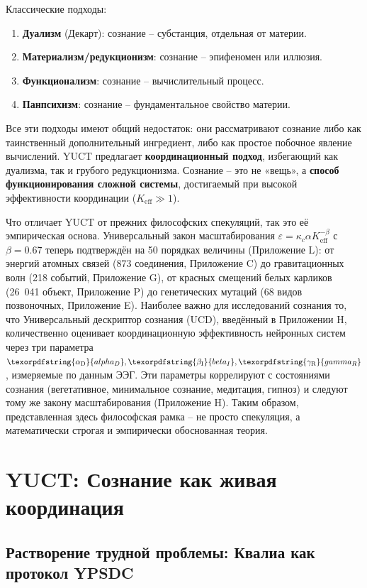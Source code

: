 \documentclass[12pt,a4paper]{article}
\DeclareRobustCommand{\alD}{\texorpdfstring{\ensuremath{\alpha_{\mathrm{D}}}}{alpha_D}}
\DeclareRobustCommand{\beI}{\texorpdfstring{\ensuremath{\beta_{\mathrm{I}}}}{beta_I}}
\DeclareRobustCommand{\gaR}{\texorpdfstring{\ensuremath{\gamma_{\mathrm{R}}}}{gamma_R}}
\newcommand{\eff}{\mathrm{eff}}
\newcommand{\Ke}{K_{\eff}}
\begin{document}
	Классические подходы:
	\begin{enumerate}
		\item \textbf{Дуализм} (Декарт): сознание – субстанция, отдельная от материи.
		\item \textbf{Материализм/редукционизм}: сознание – эпифеномен или иллюзия.
		\item \textbf{Функционализм}: сознание – вычислительный процесс.
		\item \textbf{Панпсихизм}: сознание – фундаментальное свойство материи.
	\end{enumerate}
	
	Все эти подходы имеют общий недостаток: они рассматривают сознание либо как таинственный дополнительный ингредиент, либо как простое побочное явление вычислений. YUCT предлагает \textbf{координационный подход}, избегающий как дуализма, так и грубого редукционизма. Сознание – это не «вещь», а \textbf{способ функционирования сложной системы}, достигаемый при высокой эффективности координации ($\Ke \gg 1$).
	
	Что отличает YUCT от прежних философских спекуляций, так это её эмпирическая основа. Универсальный закон масштабирования \(\varepsilon = \kappa_c \alpha \Ke^{-\beta}\) с \(\beta = 0.67\) теперь подтверждён на 50 порядках величины (Приложение L): от энергий атомных связей (873 соединения, Приложение C) до гравитационных волн (218 событий, Приложение G), от красных смещений белых карликов (26 041 объект, Приложение P) до генетических мутаций (68 видов позвоночных, Приложение E). Наиболее важно для исследований сознания то, что Универсальный дескриптор сознания (UCD), введённый в Приложении H, количественно оценивает координационную эффективность нейронных систем через три параметра \(\alD, \beI, \gaR\), измеряемые по данным ЭЭГ. Эти параметры коррелируют с состояниями сознания (вегетативное, минимальное сознание, медитация, гипноз) и следуют тому же закону масштабирования (Приложение H). Таким образом, представленная здесь философская рамка – не просто спекуляция, а математически строгая и эмпирически обоснованная теория.
	
	\section{YUCT: Сознание как живая координация}
	
	\subsection{Растворение трудной проблемы: Квалиа как протокол YPSDC}
	
\end{document}
